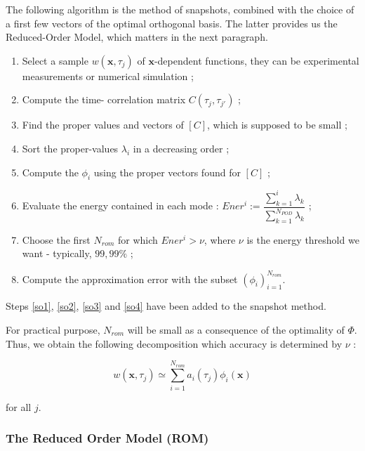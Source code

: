 \par
The following algorithm is the method of snapshots, combined with the choice of a first few vectors of the optimal orthogonal basis. %
The latter provides us the Reduced-Order Model, which matters in the next paragraph.

\begin{algo}\label{a_snap}
\begin{enumerate}
\item Select a sample $w(\mathbf{x},\tau_j)$ of $\mathbf{x}$-dependent functions, %
they can be experimental measurements or numerical simulation ;
\item Compute the \og{}time-\fg{} correlation matrix $C(\tau_j ,\tau_{j'})$ ;
\item Find the proper values and vectors of $[C]$, which is supposed to be small ;
\item\label{so1} Sort the proper-values $\lambda_i$ in a decreasing order ;
\item Compute the $\phi_i$ using the proper vectors found for $[C]$ ;
\item\label{so2} Evaluate the energy contained in each mode : $Ener^i:=\dfrac{\sum\limits_{k=1}^i\lambda_k}{\sum\limits_{k=1}^{N_{POD}}\lambda_k}$ ;
\item\label{so3} Choose the first $N_{rom}$ for which $Ener^i >\nu$, where $\nu$ is the energy threshold we want - typically, $99,99\%$ ;
\item\label{so4} Compute the approximation error with the subset $(\phi_i)_{i=1}^{N_{rom}}$.
\end{enumerate}
\end{algo}

Steps \ref{so1}, \ref{so2}, \ref{so3} and \ref{so4} have been added to the snapshot method.

\par
For practical purpose, $N_{rom}$ will be small as a consequence of the optimality of $\Phi$. %
Thus, we obtain the following decomposition which accuracy is determined by $\nu$ :

\begin{equation}
\label{red_pod}
w(\mathbf{x},\tau_j)\simeq\sum\limits_{i=1}^{N_{rom}} a_i(\tau_j)\phi_i(\mathbf{x})
\end{equation}

for all $j$.

\subsubsection{The Reduced Order Model (ROM)}

